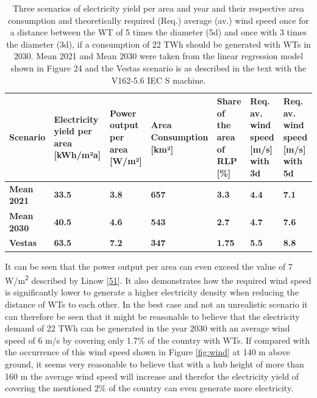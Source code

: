 \documentclass[a4paper,11pt]{article}
\begin{document}
\begin{table}[H]

\caption{\label{tab:table2}Three scenarios of electricity yield per area and year and their respective area consumption 
  and theoretically required (Req.) average (av.) wind speed once for a distance between the WT of 5 times 
  the diameter (5d)  and once with 3 times the diameter (3d), if a consumption of 22 TWh should be generated 
  with WTs in 2030. Mean 2021 and Mean 2030 were taken from the linear regression model shown in Figure 24 
  and the Vestas scenario is as described in the text with the V162-5.6 IEC S machine.}
\centering
\begin{tabular}[t]{>{\raggedright\arraybackslash}p{1.8cm}>{\raggedright\arraybackslash}p{1.8cm}>{\raggedright\arraybackslash}p{1.8cm}>{\raggedright\arraybackslash}p{1.8cm}>{\raggedright\arraybackslash}p{1.8cm}>{\raggedright\arraybackslash}p{1.8cm}>{\raggedright\arraybackslash}p{1.8cm}}
\toprule
Scenario & Electricity yield per area [kWh/m²a] & Power output per area [W/m²] & Area Consumption [km²] & Share of the area of RLP [\%] & Req. av. wind speed [m/s] with 3d & Req. av. wind speed [m/s] with 5d\\
\midrule
\textbf{Mean 2021} & \textbf{33.5} & \textbf{3.8} & \textbf{657} & \textbf{3.3} & \textbf{4.4} & \textbf{7.1}\\
\midrule
\textbf{Mean 2030} & \textbf{40.5} & \textbf{4.6} & \textbf{543} & \textbf{2.7} & \textbf{4.7} & \textbf{7.6}\\
\midrule
\textbf{Vestas} & \textbf{63.5} & \textbf{7.2} & \textbf{347} & \textbf{1.75} & \textbf{5.5} & \textbf{8.8}\\
\midrule
\bottomrule
\end{tabular}
\end{table}
It can be seen that the power output per area can even exceed the value of 7 W/m\textsuperscript{2} described by Linow {[}\protect\hyperlink{ref-SvenLinow.2020}{51}{]}. It also demonstrates how the required wind speed is significantly lower to generate a higher electricity density when reducing the distance of WTs to each other. In the best case and not an unrealistic scenario it can therefore be seen that it might be reasonable to believe that the electricity demand of 22 TWh can be generated in the year 2030 with an average wind speed of 6 m/s by covering only 1.7\% of the country with WTs. If compared with the occurrence of this wind speed shown in Figure \ref{fig:wind} at 140 m above ground, it seems very reasonable to believe that with a hub height of more than 160 m the average wind speed will increase and therefor the electricity yield of covering the mentioned 2\% of the country can even generate more electricity.
\end{document}
